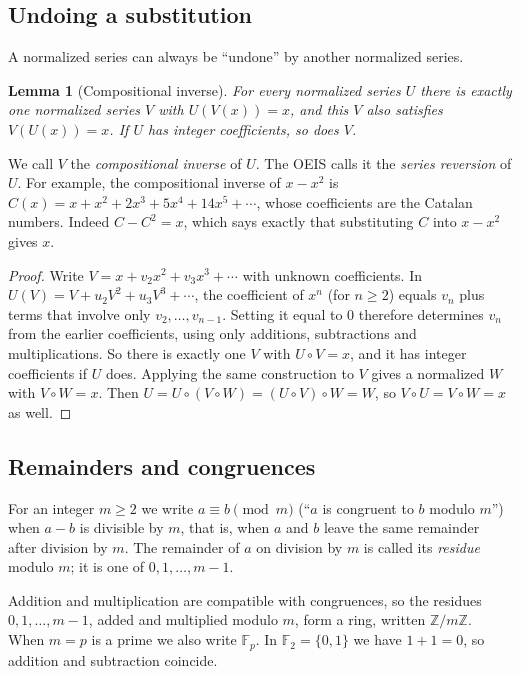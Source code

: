\documentclass[11pt,a4paper]{article}
\newtheorem{lemma}[theorem]{Lemma}
\theoremstyle{definition}
\theoremstyle{remark}
\newcommand{\Z}{\mathbb{Z}}
\newcommand{\F}{\mathbb{F}}
\begin{document}
\subsection{Undoing a substitution}
A normalized series can always be ``undone'' by another normalized series.

\begin{lemma}[Compositional inverse]\label{lem:inverse}
For every normalized series $U$ there is exactly one normalized series $V$ with $U(V(x))=x$, and this $V$ also
satisfies $V(U(x))=x$. If $U$ has integer coefficients, so does $V$.
\end{lemma}

We call $V$ the \emph{compositional inverse} of $U$. The OEIS calls it the \emph{series reversion} of $U$. For example,
the compositional inverse of $x-x^2$ is $C(x)=x+x^2+2x^3+5x^4+14x^5+\cdots$, whose coefficients are the Catalan numbers.
Indeed $C-C^2=x$, which says exactly that substituting $C$ into $x-x^2$ gives $x$.

\begin{proof}
Write $V=x+v_2x^2+v_3x^3+\cdots$ with unknown coefficients. In
$U(V)=V+u_2V^2+u_3V^3+\cdots$, the coefficient of $x^n$ (for $n\ge2$) equals $v_n$ plus terms that involve only
$v_2,\dots,v_{n-1}$. Setting it equal to $0$ therefore determines $v_n$ from the earlier coefficients, using only
additions, subtractions and multiplications. So there is exactly one $V$ with $U\circ V=x$, and it has integer
coefficients if $U$ does. Applying the same construction to $V$ gives a normalized $W$ with $V\circ W=x$. Then
$U=U\circ(V\circ W)=(U\circ V)\circ W=W$, so $V\circ U=V\circ W=x$ as well.
\end{proof}

\subsection{Remainders and congruences}
For an integer $m\ge2$ we write $a\equiv b\pmod m$ (``$a$ is congruent to $b$ modulo $m$'') when $a-b$ is divisible by
$m$, that is, when $a$ and $b$ leave the same remainder after division by $m$. The remainder of $a$ on division by
$m$ is called its \emph{residue} modulo $m$; it is one of $0,1,\dots,m-1$.

Addition and multiplication are compatible with congruences, so the residues $0,1,\dots,m-1$, added and multiplied
modulo $m$, form a ring, written $\Z/m\Z$. When $m=p$ is a prime we also write $\F_p$. In $\F_2=\{0,1\}$ we have $1+1=0$,
so addition and subtraction coincide.
\end{document}
